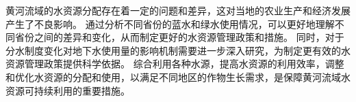 黄河流域的水资源分配存在着一定的问题和差异，这对当地的农业生产和经济发展产生了不良影响。
通过分析不同省份的蓝水和绿水使用情况，可以更好地理解不同省份之间的差异和变化，从而制定更好的水资源管理政策和措施。
同时，对于分水制度变化对地下水使用量的影响机制需要进一步深入研究，为制定更有效的水资源管理政策提供科学依据。
综合利用各种水源，提高水资源的利用效率，调整和优化水资源的分配和使用，以满足不同地区的作物生长需求，是保障黄河流域水资源可持续利用的重要措施。


